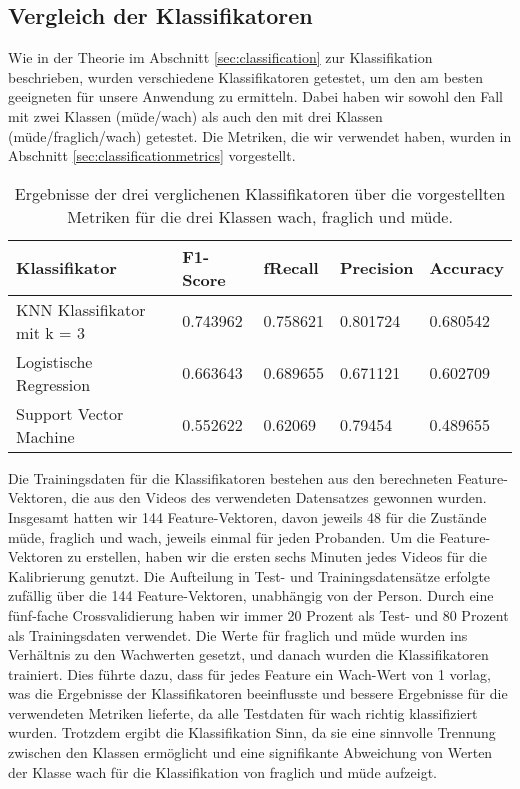 \subsection{Vergleich der Klassifikatoren}
\label{subsec:classificatorcomparison}
Wie in der Theorie im Abschnitt \ref{sec:classification} zur Klassifikation beschrieben, wurden verschiedene Klassifikatoren getestet, um den am besten geeigneten für unsere Anwendung zu ermitteln. Dabei haben wir sowohl den Fall mit zwei Klassen (müde/wach) als auch den mit drei Klassen (müde/fraglich/wach) getestet. Die Metriken, die wir verwendet haben, wurden in Abschnitt \ref{sec:classificationmetrics} vorgestellt.

\begin{table}
    \centering
    \begin{tabular}{|l|l|l|l|l|}
    \hline
        {Klassifikator} & {F1-Score} & f{Recall} & {Precision} & {Accuracy} \\ \hline
        {KNN Klassifikator mit k = 3} & 0.743962 & 0.758621 & 0.801724 & 0.680542 \\ \hline
        {Logistische Regression} & 0.663643 & 0.689655 & 0.671121 & 0.602709 \\ \hline
        {Support Vector Machine} & 0.552622 & 0.62069 & 0.79454 & 0.489655 \\ \hline
    \end{tabular}
\caption{Ergebnisse der drei verglichenen Klassifikatoren über die vorgestellten Metriken für die drei Klassen wach, fraglich und müde.}
\label{table:threeclassificator}
\end{table}

Die Trainingsdaten für die Klassifikatoren bestehen aus den berechneten Feature-Vektoren, die aus den Videos des verwendeten Datensatzes gewonnen wurden. Insgesamt hatten wir 144 Feature-Vektoren, davon jeweils 48 für die Zustände \glqq müde\grqq{}, \glqq fraglich\grqq{} und \glqq wach\grqq{}, jeweils einmal für jeden Probanden. Um die Feature-Vektoren zu erstellen, haben wir die ersten sechs Minuten jedes Videos für die Kalibrierung genutzt. Die Aufteilung in Test- und Trainingsdatensätze erfolgte zufällig über die 144 Feature-Vektoren, unabhängig von der Person. Durch eine fünf-fache Crossvalidierung haben wir immer 20 Prozent als Test- und 80 Prozent als Trainingsdaten verwendet. Die Werte für \glqq fraglich\grqq{} und \glqq müde\grqq{} wurden ins Verhältnis zu den Wachwerten gesetzt, und danach wurden die Klassifikatoren trainiert. Dies führte dazu, dass für jedes Feature ein Wach-Wert von 1 vorlag, was die Ergebnisse der Klassifikatoren beeinflusste und bessere Ergebnisse für die verwendeten Metriken lieferte, da alle Testdaten für \glqq wach\grqq{} richtig klassifiziert wurden. Trotzdem ergibt die Klassifikation Sinn, da sie eine sinnvolle Trennung zwischen den Klassen ermöglicht und eine signifikante Abweichung von Werten der Klasse \glqq wach\grqq{} für die Klassifikation von \glqq fraglich\grqq{} und \glqq müde\grqq{} aufzeigt.

